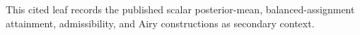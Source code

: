 This cited leaf records the published scalar posterior-mean, balanced-assignment attainment, admissibility, and Airy constructions as secondary context.